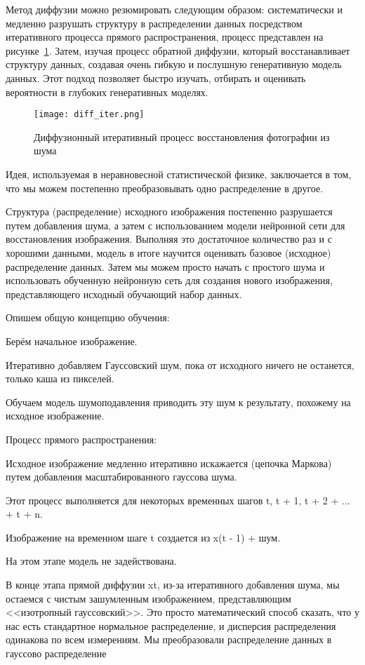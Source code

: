Метод диффузии можно резюмировать следующим образом: 
систематически и медленно разрушать структуру в распределении данных 
посредством итеративного процесса прямого распространения, процесс 
представлен на рисунке~\ref{func::diff}. Затем, изучая процесс обратной диффузии, 
который восстанавливает структуру данных, создавая очень гибкую и 
послушную генеративную модель данных. Этот подход позволяет быстро 
изучать, отбирать и оценивать вероятности в глубоких генеративных моделях.

\begin{figure}[ht]
    \centering
    \texttt{[image: diff\_iter.png]}
    \caption{Диффузионный итеративный процесс восстановления фотографии из шума}
    \label{func::diff}
\end{figure}

Идея, используемая в неравновесной статистической физике, заключается в том, что мы можем постепенно преобразовывать одно распределение в другое.

Структура (распределение) исходного изображения постепенно 
разрушается путем добавления шума, а затем с использованием модели 
нейронной сети для восстановления изображения. Выполняя это достаточное количество раз и с хорошими данными, модель в итоге научится оценивать базовое (исходное) распределение данных. Затем мы можем просто начать с простого шума и использовать обученную нейронную сеть для создания нового изображения, представляющего исходный обучающий набор данных.

Опишем общую концепцию обучения:

\begin{enumerate_num}
    \item Берём начальное изображение.
    \item Итеративно добавляем Гауссовский шум, пока от исходного ничего не останется, только каша из пикселей.
    \item Обучаем модель шумоподавления приводить эту шум к результату, 
похожему на исходное изображение.
\end{enumerate_num}

Процесс прямого распространения:

\begin{enumerate_num}
    \item Исходное изображение медленно итеративно искажается (цепочка Маркова) путем добавления масштабированного гауссова шума.
    \item Этот процесс выполняется для некоторых временных шагов t, t + 1, t + 2 + ... + t + n.
    \item Изображение на временном шаге t создается из x(t - 1) + шум.
    \item На этом этапе модель не задействована.
    \item В конце этапа прямой диффузии xt, из-за итеративного добавления шума, мы остаемся с чистым зашумленным изображением, представляющим <<изотропный гауссовский>>. Это просто математический способ сказать, что у нас есть стандартное нормальное распределение, и дисперсия распределения одинакова по всем измерениям. Мы преобразовали распределение данных в гауссово распределение   
\end{enumerate_num}

